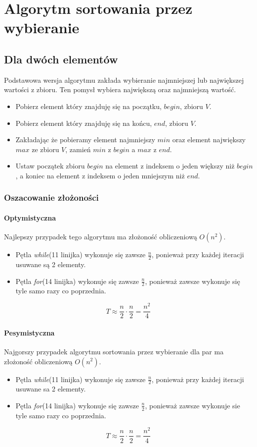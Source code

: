 \section{Algorytm sortowania przez wybieranie}
\subsection{Dla dwóch elementów}
Podstawowa wersja algorytmu zakłada wybieranie najmniejszej lub największej wartości z zbioru. Ten pomysł wybiera największą oraz najmniejszą wartość.
\begin{itemize}
\item Pobierz element który znajduję się na początku, $begin$, zbioru $V$.
\item Pobierz element który znajduję się na końcu, $end$, zbioru $V$.
\item Zakładając że pobieramy element najmniejszy $min$ oraz element największy $max$ ze zbioru $V$, zamień $min$ z $begin$ a $max$ z $end$.
\item Ustaw początek zbioru $begin$ na element z indeksem o jeden większy niż $begin$, a koniec na element z indeksem o jeden mniejszym niż $end$.
\end{itemize}
 
\subsubsection{Oszacowanie złożoności}
\paragraph{Optymistyczna}
Najlepszy przypadek tego algorytmu ma złożoność obliczeniową $O(n^2)$. 
\begin{itemize}
\item Pętla \textit{while}(11 linijka) wykonuje się zawsze $\frac{n}{2}$, ponieważ przy każdej iteracji usuwane są 2 elementy.
\item Pętla \textit{for}(14 linijka) wykonuje się zawsze $\frac{n}{2}$, ponieważ zawsze wykonuje się tyle samo razy co poprzednia.
\end{itemize}

\begin{equation*}
T \approx \frac{n}{2} \cdot \frac{n}{2} = \frac{n^2}{4}
\end{equation*}
\wyjT
\paragraph{Pesymistyczna}
Najgorszy przypadek algorytmu sortowania przez wybieranie dla par ma złożoność obliczeniową $O(n^2)$.
\begin{itemize}
\item Pętla \textit{while}(11 linijka) wykonuje się zawsze $\frac{n}{2}$, ponieważ przy każdej iteracji usuwane sa 2 elementy.
\item Pętla \textit{for}(14 linijka) wykonuje się zawsze $\frac{n}{2}$, ponieważ zawsze wykonuje sie tyle samo razy co poprzednia.
\end{itemize}
\begin{equation*}
T \approx \frac{n}{2} \cdot \frac{n}{2} = \frac{n^2}{4}
\end{equation*}
\wyjT
